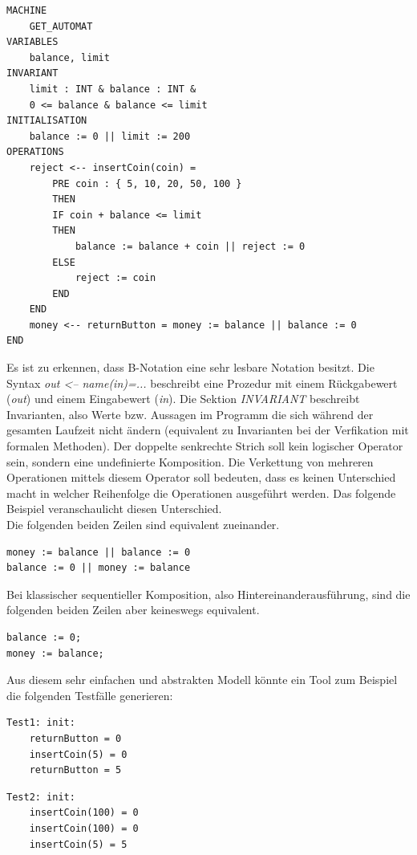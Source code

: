 \begin{lstlisting}[caption={Modell eines Getränkeautomaten in B-Notation},label=lst:b-notation]
MACHINE
	GET_AUTOMAT
VARIABLES
	balance, limit
INVARIANT
	limit : INT & balance : INT &
	0 <= balance & balance <= limit
INITIALISATION
	balance := 0 || limit := 200
OPERATIONS
	reject <-- insertCoin(coin) =
		PRE coin : { 5, 10, 20, 50, 100 }
		THEN
		IF coin + balance <= limit
		THEN
			balance := balance + coin || reject := 0
		ELSE
			reject := coin
		END
	END
	money <-- returnButton = money := balance || balance := 0
END
\end{lstlisting}

Es ist zu erkennen, dass B-Notation eine sehr lesbare Notation besitzt. Die Syntax \textit{out <-- name(in)=...} beschreibt eine Prozedur mit einem Rückgabewert (\textit{out}) und einem Eingabewert (\textit{in}). Die Sektion \textit{INVARIANT} beschreibt Invarianten, also Werte bzw. Aussagen im Programm die sich während der gesamten Laufzeit nicht ändern (equivalent zu Invarianten bei der Verfikation mit formalen Methoden). Der doppelte senkrechte Strich soll kein logischer Operator sein, sondern eine undefinierte Komposition. Die Verkettung von mehreren Operationen mittels diesem Operator soll bedeuten, dass es keinen Unterschied macht in welcher Reihenfolge die Operationen ausgeführt werden. Das folgende Beispiel veranschaulicht diesen Unterschied.\\

Die folgenden beiden Zeilen sind equivalent zueinander.
\begin{verbatim}
money := balance || balance := 0
balance := 0 || money := balance
\end{verbatim}

Bei klassischer sequentieller Komposition, also Hintereinanderausführung, sind die folgenden beiden Zeilen aber keineswegs equivalent.
\begin{verbatim}
balance := 0;
money := balance;
\end{verbatim}

Aus diesem sehr einfachen und abstrakten Modell könnte ein Tool zum Beispiel die folgenden Testfälle generieren:\\


\begin{verbatim}
Test1: init:
	returnButton = 0
	insertCoin(5) = 0
	returnButton = 5
\end{verbatim}

\begin{verbatim}
Test2: init:
	insertCoin(100) = 0
	insertCoin(100) = 0
	insertCoin(5) = 5
\end{verbatim}

